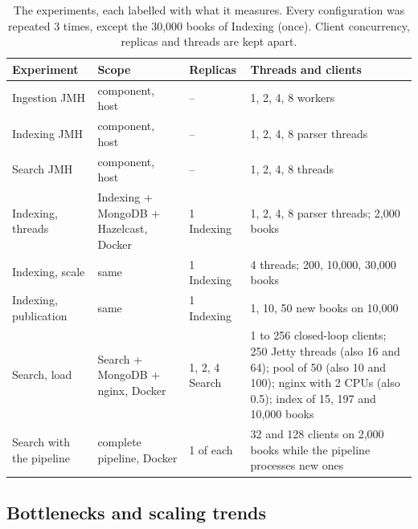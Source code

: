\begin{table}[H]
\centering\small
\begin{tabularx}{\linewidth}{@{}L{3.1cm}L{2.2cm}L{2.2cm}X@{}}
\toprule
\textbf{Experiment} & \textbf{Scope} & \textbf{Replicas} & \textbf{Threads and clients} \\
\midrule
Ingestion JMH & component, host & -- & 1, 2, 4, 8 workers \\
Indexing JMH & component, host & -- & 1, 2, 4, 8 parser threads \\
Search JMH & component, host & -- & 1, 2, 4, 8 threads \\
Indexing, threads & Indexing + MongoDB + Hazelcast, Docker & 1 Indexing & 1, 2, 4, 8 parser threads; 2,000 books \\
Indexing, scale & same & 1 Indexing & 4 threads; 200, 10,000, 30,000 books \\
Indexing, publication & same & 1 Indexing & 1, 10, 50 new books on 10,000 \\
Search, load & Search + MongoDB + nginx, Docker & 1, 2, 4 Search & 1 to 256 closed-loop clients; 250 Jetty threads
  (also 16 and 64); pool of 50 (also 10 and 100); nginx with 2 CPUs (also 0.5); index of 15, 197 and 10,000 books \\
Search with the pipeline & complete pipeline, Docker & 1 of each & 32 and 128 clients on 2,000 books while the
  pipeline processes new ones \\
\bottomrule
\end{tabularx}
\caption{The experiments, each labelled with what it measures. Every configuration was repeated 3 times, except the
30,000 books of Indexing (once). Client concurrency, replicas and threads are kept apart.}
\label{tab:experiments}
\end{table}

\subsection{Bottlenecks and scaling trends}

